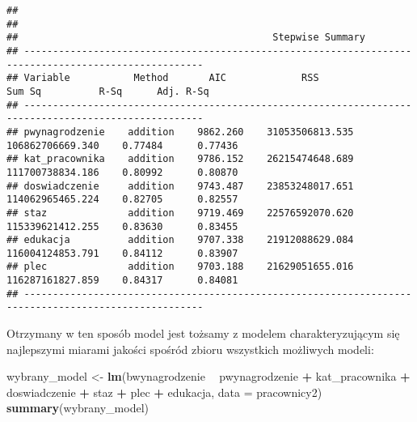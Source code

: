 \documentclass[]{book}
\newenvironment{Shaded}{\begin{snugshade}}{\end{snugshade}}
\newcommand{\KeywordTok}[1]{\textcolor[rgb]{0.13,0.29,0.53}{\textbf{#1}}}
\newcommand{\DataTypeTok}[1]{\textcolor[rgb]{0.13,0.29,0.53}{#1}}
\newcommand{\StringTok}[1]{\textcolor[rgb]{0.31,0.60,0.02}{#1}}
\newcommand{\OperatorTok}[1]{\textcolor[rgb]{0.81,0.36,0.00}{\textbf{#1}}}
\newcommand{\NormalTok}[1]{#1}
\begin{document}
\begin{verbatim}
## 
## 
##                                            Stepwise Summary                                            
## -----------------------------------------------------------------------------------------------------
## Variable           Method       AIC             RSS               Sum Sq          R-Sq      Adj. R-Sq 
## -----------------------------------------------------------------------------------------------------
## pwynagrodzenie    addition    9862.260    31053506813.535    106862706669.340    0.77484      0.77436 
## kat_pracownika    addition    9786.152    26215474648.689    111700738834.186    0.80992      0.80870 
## doswiadczenie     addition    9743.487    23853248017.651    114062965465.224    0.82705      0.82557 
## staz              addition    9719.469    22576592070.620    115339621412.255    0.83630      0.83455 
## edukacja          addition    9707.338    21912088629.084    116004124853.791    0.84112      0.83907 
## plec              addition    9703.188    21629051655.016    116287161827.859    0.84317      0.84081 
## -----------------------------------------------------------------------------------------------------
\end{verbatim}

Otrzymany w ten sposób model jest tożsamy z modelem charakteryzującym
się najlepszymi miarami jakości spośród zbioru wszystkich możliwych
modeli:

\begin{Shaded}
\begin{Highlighting}[]
\NormalTok{wybrany_model <-}\StringTok{ }\KeywordTok{lm}\NormalTok{(bwynagrodzenie }\OperatorTok{~}\StringTok{ }\NormalTok{pwynagrodzenie }\OperatorTok{+}\StringTok{ }\NormalTok{kat_pracownika }\OperatorTok{+}\StringTok{ }\NormalTok{doswiadczenie }\OperatorTok{+}\StringTok{ }\NormalTok{staz }\OperatorTok{+}\StringTok{ }\NormalTok{plec }\OperatorTok{+}\StringTok{ }\NormalTok{edukacja, }\DataTypeTok{data =}\NormalTok{ pracownicy2)}
\KeywordTok{summary}\NormalTok{(wybrany_model)}
\end{Highlighting}
\end{Shaded}
\end{document}
